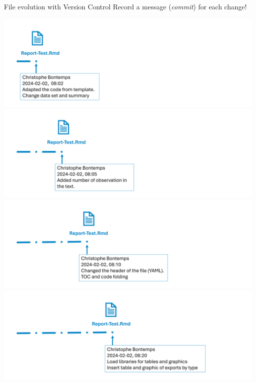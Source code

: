\documentclass[xcolor=x11names,compress, aspectratio=169]{beamer}
\renewcommand{\(}{\begin{columns}}
\renewcommand{\)}{\end{columns}}
\newcommand{\<}[1]{\begin{column}{#1}}
\renewcommand{\>}{\end{column}}
\begin{document}
\begin{frame}{File evolution  \textcolor{brique}{with Version Control}  }
Record a message (\emph{commit})  for each change!
\begin{center}
\begin{itemize}
    {\includegraphics[width = 1.0\textwidth]{FileLife1.png} \\ }
    {\includegraphics[width = 1.0\textwidth]{FileLife2.png} \\ }
    {\includegraphics[width = 1.0\textwidth]{FileLife3.png} \\ }
    {\includegraphics[width = 1.0\textwidth]{FileLife4.png} \\ }

\end{itemize}
\end{center}
\end{frame}
\end{document}
